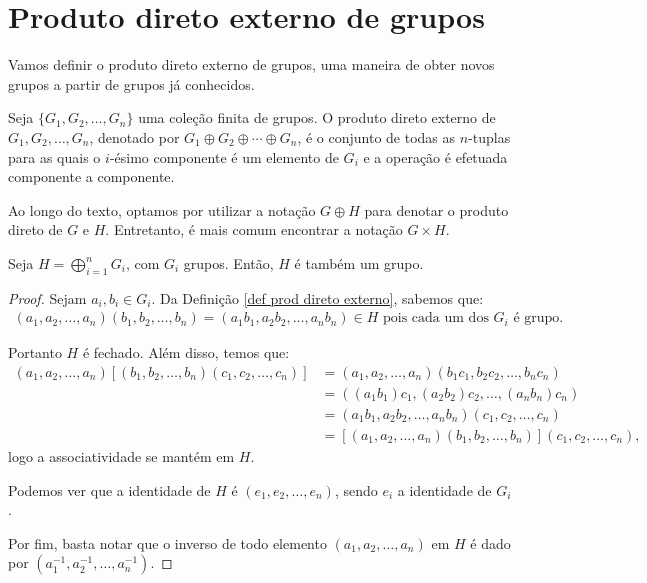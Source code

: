 \section{Produto direto externo de grupos}
\label{sec-prod-direto-grupos}
    Vamos definir o produto direto externo de grupos, uma maneira de
    obter novos grupos a partir de grupos já conhecidos.
	\begin{definition}
	\label{def prod direto externo}
		Seja $\{G_1, G_2, \dots, G_n\}$ uma coleção finita de grupos. 
		O produto direto externo de $G_1, G_2, \dots, G_n$, denotado por
		$\displaystyle{G_1\oplus G_2\oplus\cdots\oplus G_n}$, é o conjunto 
		de todas as $n$-tuplas para as quais o $i$-ésimo componente é um
		elemento de $G_i$ e a operação é efetuada componente a componente.
	\end{definition}
	\begin{remark}
	    Ao longo do texto, optamos por utilizar a notação $G\oplus H$ para
	    denotar o produto direto de $G$ e $H$. Entretanto, é mais comum
	    encontrar a notação $G\times H$.
	\end{remark}
	\begin{theorem}
		Seja $\displaystyle{H = \bigoplus_{i=1}^{n}G_i}$, com $G_i$ grupos.
		Então, $H$ é também um grupo.
	\end{theorem}
	\begin{proof}
		Sejam $a_i, b_i\in G_i$. Da Definição \ref{def prod direto externo},
		sabemos que:
		\begin{align*}
		    (a_1, a_2, \dots, a_n)(b_1, b_2, \dots, b_n) 
		    = 
		    (a_1b_1, a_2b_2, \dots, a_nb_n)\in H 
		    \text{ pois cada um dos } G_i \text{ é grupo.}
		\end{align*}
		\par Portanto $H$ é fechado. Além disso, temos que:
		\begin{align*}
		    (a_1, a_2, \dots, a_n)[(b_1, b_2, \dots, b_n)(c_1, c_2, \dots, c_n)] 
		    &= (a_1, a_2, \dots, a_n)(b_1c_1, b_2c_2, \dots, b_nc_n) \\ 
		    &= ((a_1b_1)c_1, (a_2b_2)c_2, \dots, (a_nb_n)c_n) \\ 
		    &= (a_1b_1, a_2b_2, \dots, a_nb_n)(c_1, c_2, \dots, c_n) \\ 
		    &= [(a_1, a_2, \dots, a_n)(b_1, b_2, \dots, b_n)](c_1, c_2, \dots, c_n),
		\end{align*}
		logo a associatividade se mantém em $H$.
		\par\vspace{0.3cm} Podemos ver que a identidade de $H$ é 
		$(e_1, e_2, \dots, e_n)$, sendo $e_i$ a identidade de $G_i$.
		\par\vspace{0.3cm} Por fim, basta notar que o inverso de todo 
		elemento $(a_1, a_2, \dots, a_n)$ em $H$ é dado por
		$(a_1^{-1}, a_2^{-1}, \dots, a_n^{-1})$.
	\end{proof}

